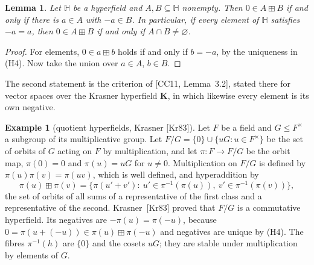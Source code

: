 \documentclass[12pt]{article}
\theoremstyle{plain}
\newtheorem{lemma}[theorem]{Lemma}
\theoremstyle{definition}
\newtheorem{example}[theorem]{Example}
\newcommand{\Hh}{\mathbb{H}}
\newcommand{\bp}{\boxplus}
\begin{document}
\begin{lemma}\label{lem:zero}
Let $\Hh$ be a hyperfield and $A,B\subseteq\Hh$ nonempty.  Then
$0\in A\bp B$ if and only if there is $a\in A$ with $-a\in B$.
In particular, if every element of $\Hh$ satisfies $-a=a$, then
$0\in A\bp B$ if and only if $A\cap B\neq\varnothing$.
\end{lemma}
\begin{proof}
For elements, $0\in a\bp b$ holds if and only if $b=-a$, by the
uniqueness in (H4).  Now take the union over $a\in A$, $b\in B$.
\end{proof}

The second statement is the criterion of [CC11, Lemma~3.2], stated
there for vector spaces over the Krasner hyperfield $\mathbf K$, in
which likewise every element is its own negative.

\begin{example}[quotient hyperfields, Krasner {[Kr83]}]\label{ex:quotient}
Let $F$ be a field and $G\leq F^\times$ a subgroup of its multiplicative
group.  Let $F/G=\{0\}\cup\{uG:u\in F^\times\}$ be the set of orbits of
$G$ acting on $F$ by multiplication, and let $\pi\colon F\to F/G$ be the
orbit map, $\pi(0)=0$ and $\pi(u)=uG$ for $u\neq0$.  Multiplication on
$F/G$ is defined by $\pi(u)\pi(v)=\pi(uv)$, which is well defined, and
hyperaddition by
\[
 \pi(u)\bp\pi(v)
 =\bigl\{\pi(u'+v'):\ u'\in\pi^{-1}(\pi(u)),\ v'\in\pi^{-1}(\pi(v))\bigr\},
\]
the set of orbits of all sums of a representative of the first class
and a representative of the second.  Krasner~[Kr83] proved that $F/G$
is a commutative hyperfield.  Its negatives are $-\pi(u)=\pi(-u)$,
because $0=\pi(u+(-u))\in\pi(u)\bp\pi(-u)$ and negatives are unique by
(H4).  The fibres $\pi^{-1}(h)$ are $\{0\}$ and the cosets $uG$; they
are stable under multiplication by elements of $G$.
\end{example}
\end{document}
